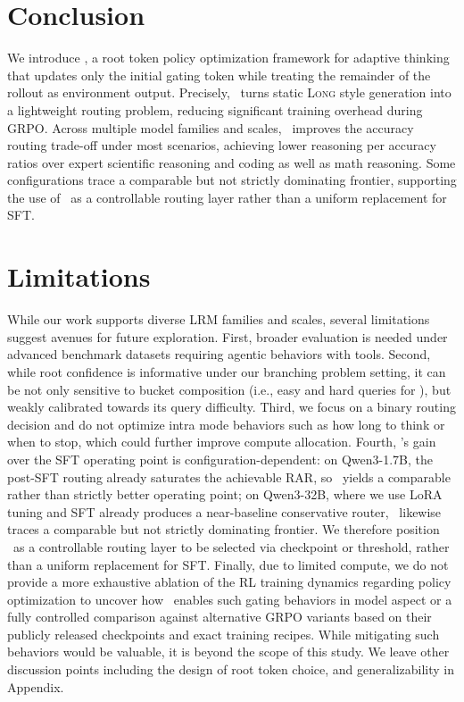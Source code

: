 \vspace{-5pt}
\section{Conclusion}\label{sec:conclusion}
We introduce \Ours, a root token policy optimization framework for adaptive thinking that updates only the initial gating token while treating the remainder of the rollout as environment output. Precisely, \Ours~turns static \textsc{Long} style generation into a lightweight routing problem, reducing significant training overhead during GRPO.
Across multiple model families and scales, \Ours~improves the accuracy routing trade-off under most scenarios, achieving lower reasoning per accuracy ratios over expert scientific reasoning and coding as well as math reasoning. 
Some configurations trace a comparable but not strictly dominating frontier, supporting the use of \Ours~as a controllable routing layer rather than a uniform replacement for SFT.

\vspace{-5pt}
\section*{Limitations}
While our work supports diverse LRM families and scales, several limitations suggest avenues for future exploration. First, broader evaluation is needed under advanced benchmark datasets requiring agentic behaviors with tools.
Second, while root confidence is informative under our branching problem setting, it can be not only sensitive to bucket composition (i.e., easy and hard queries for \Ours), but weakly calibrated towards its query difficulty.
Third, we focus on a binary routing decision and do not optimize intra mode behaviors such as how long to think or when to stop, which could further improve compute allocation.
Fourth, \Ours's gain over the SFT operating point is configuration-dependent: on Qwen3-1.7B, the post-SFT routing already saturates the achievable RAR, so \Ours~yields a comparable rather than strictly better operating point; on Qwen3-32B, where we use LoRA tuning and SFT already produces a near-baseline conservative router, \Ours~likewise traces a comparable but not strictly dominating frontier. We therefore position \Ours~as a controllable routing layer to be selected via checkpoint or threshold, rather than a uniform replacement for SFT.
Finally, due to limited compute, we do not provide a more exhaustive ablation of the RL training dynamics regarding policy optimization to uncover how \Ours~enables such gating behaviors in model aspect or a fully controlled comparison against alternative GRPO variants based on their publicly released checkpoints and exact training recipes.
While mitigating such behaviors would be valuable, it is beyond the scope of this study. We leave other discussion points including the design of root token choice, and generalizability in Appendix. 

